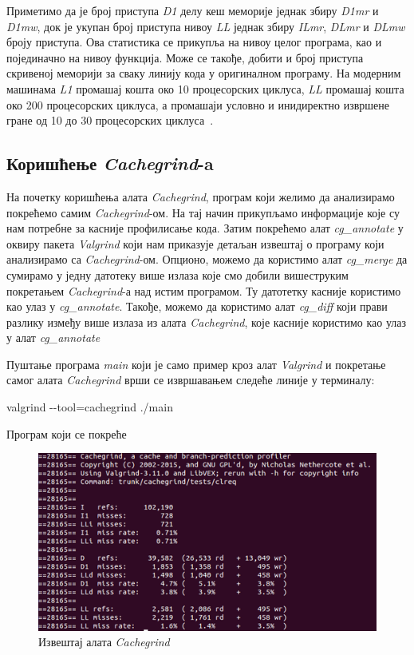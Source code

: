\documentclass[12pt,oneside]{memoir}
\begin{document}
\indent Приметимо да је број приступа \textit{D1} делу кеш меморије једнак збиру \textit{D1mr} и \textit{D1mw}, док је укупан број приступа нивоу \textit{LL} једнак збиру  \textit{ILmr}, \textit{DLmr} и \textit{DLmw} броју приступа. Ова статистика се прикупља на нивоу целог програма, као и појединачно на нивоу функција. Може се такође, добити и број приступа скривеној меморији за сваку линију кода у оригиналном програму. На модерним машинама \textit{L1} промашај кошта око 10 процесорских циклуса, \textit{LL} промашај кошта око 200 процесорских циклуса, а промашаји условно и инидиректно извршене гране од 10 до 30 процесорских циклуса~\cite{cachegrindRef}.

\subsection{Коришћење \textit{Cachegrind}-a}

\indent На почетку коришћења алата \textit{Cachegrind}, програм који желимо да анализирамо покрећемо самим \textit{Cachegrind}-ом. На тај начин прикупљамо информације које су нам потребне за касније профилисање кода. Затим покрећемо алат \textit{cg\_annotate} у оквиру пакета \textit{Valgrind} који нам приказује детаљан извештај о програму који анализирамо са \textit{Cachegrind}-ом. Опционо, можемо да користимо алат \textit{cg\_merge} да сумирамо у једну датотеку више излаза које смо добили вишеструким покретањем \textit{Cachegrind}-а над истим програмом. Ту датотетку касније користимо као улаз у \textit{cg\_annotate}. Такође, можемо да користимо алат \textit{cg\_diff} који прави разлику између више излаза из алата \textit{Cachegrind}, које касније користимо као улаз у алат \textit{cg\_annotate}

\indent Пуштање програма \textit{main} који је само пример кроз алат \textit{Valgrind} и покретање самог алата \textit{Cachegrind} врши се извршавањем следеће линије у терминалу:

\begin{center}
\large
 valgrind -\--tool=cachegrind ./main
\end{center}

Програм који се покреће

\begin{figure}[h!]
\begin{center}
\includegraphics[scale=0.75]{slika10.png}
\end{center}
\caption{Извештај алата \textit{Cachegrind}}
\label{fig:cachegrind}
\end{figure}
\end{document}
